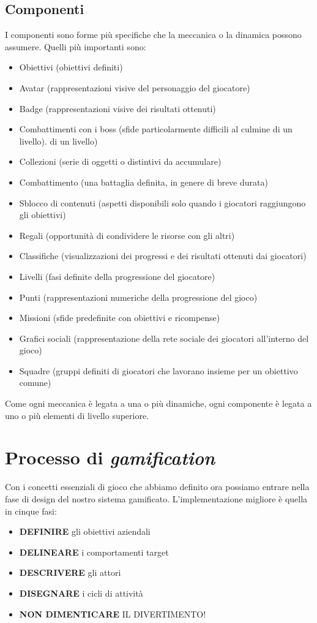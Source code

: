 \begin{itemize}
\subsection{Componenti}
I componenti sono forme più specifiche che la meccanica o la dinamica possono assumere.
Quelli più importanti sono:
\begin{itemize}
\item Obiettivi (obiettivi definiti)
\item Avatar (rappresentazioni visive del personaggio del giocatore)
\item Badge (rappresentazioni visive dei risultati ottenuti)
\item Combattimenti con i boss (sfide particolarmente difficili al culmine di un livello).
di un livello)
\item Collezioni (serie di oggetti o distintivi da accumulare)
\item Combattimento (una battaglia definita, in genere di breve durata)
\item Sblocco di contenuti (aspetti disponibili solo quando i giocatori raggiungono gli obiettivi)
\item Regali (opportunità di condividere le risorse con gli altri)
\item Classifiche (visualizzazioni dei progressi e dei risultati ottenuti dai giocatori)
\item Livelli (fasi definite della progressione del giocatore)
\item Punti (rappresentazioni numeriche della progressione del gioco)
\item Missioni (sfide predefinite con obiettivi e ricompense)
\item Grafici sociali (rappresentazione della rete sociale dei giocatori all'interno del gioco)
\item Squadre (gruppi definiti di giocatori che lavorano insieme per un obiettivo comune)
\end{itemize}
Come ogni meccanica è legata a una o più dinamiche, ogni componente è legata a uno o più elementi di livello superiore.

\section{Processo di \textit{gamification}}

Con i concetti essenziali di gioco che abbiamo definito ora possiamo entrare nella fase di design del nostro sistema gamificato.
L'implementazione migliore è quella in cinque fasi:
\begin{itemize}
\item \textbf{DEFINIRE} gli obiettivi aziendali
\item \textbf{DELINEARE} i comportamenti target
\item \textbf{DESCRIVERE} gli attori
\item \textbf{DISEGNARE} i cicli di attività
\item \textbf{NON DIMENTICARE} IL DIVERTIMENTO!
\end{itemize}

\end{itemize}
